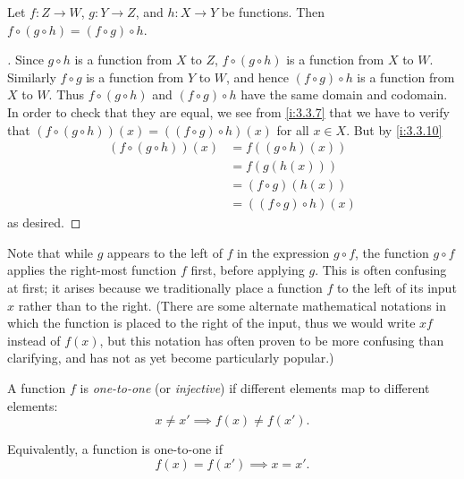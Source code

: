\setcounter{thm}{11}
\begin{lem}\label{i:3.3.12}
  Let \(f : Z \to W\), \(g : Y \to Z\), and \(h : X \to Y\) be functions.
  Then \(f \circ (g \circ h) = (f \circ g) \circ h\).
\end{lem}

\begin{proof}[]
  Since \(g \circ h\) is a function from \(X\) to \(Z\), \(f \circ (g \circ h)\) is a function from \(X\) to \(W\).
  Similarly \(f \circ g\) is a function from \(Y\) to \(W\), and hence \((f \circ g) \circ h\) is a function from \(X\) to \(W\).
  Thus \(f \circ (g \circ h)\) and \((f \circ g) \circ h\) have the same domain and codomain.
  In order to check that they are equal, we see from \cref{i:3.3.7} that we have to verify that \((f \circ (g \circ h))(x) = ((f \circ g) \circ h)(x)\) for all \(x \in X\).
  But by \cref{i:3.3.10}
  \begin{align*}
    (f \circ (g \circ h))(x)
     & = f((g \circ h)(x))        \\
     & = f(g(h(x)))               \\
     & = (f \circ g)(h(x))        \\
     & = ((f \circ g) \circ h)(x)
  \end{align*}
  as desired.
\end{proof}

\begin{rmk}\label{i:3.3.13}
  Note that while \(g\) appears to the left of \(f\) in the expression \(g \circ f\), the function \(g \circ f\) applies the right-most function \(f\) first, before applying \(g\).
  This is often confusing at first;
  it arises because we traditionally place a function \(f\) to the left of its input \(x\) rather than to the right.
  (There are some alternate mathematical notations in which the function is placed to the right of the input, thus we would write \(xf\) instead of \(f(x)\), but this notation has often proven to be more confusing than clarifying, and has not as yet become particularly popular.)
\end{rmk}

\begin{defn}\label{i:3.3.14}
  A function \(f\) is \emph{one-to-one} (or \emph{injective}) if different elements map to different elements:
  \[
    x \neq x' \implies f(x) \neq f(x').
  \]

  Equivalently, a function is one-to-one if
  \[
    f(x) = f(x') \implies x = x'.
  \]
\end{defn}

